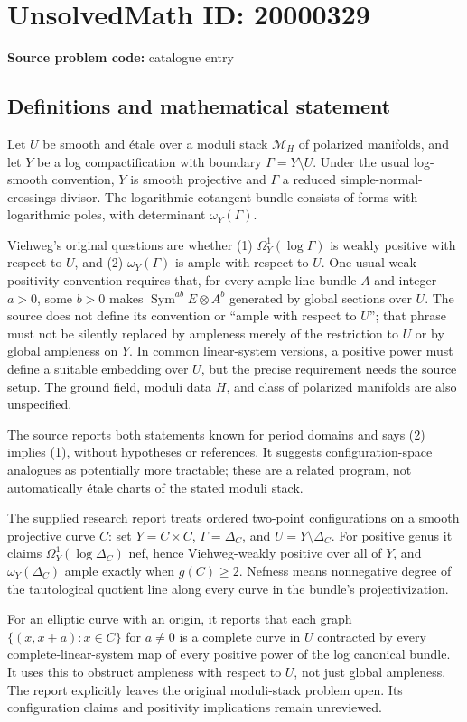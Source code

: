 \documentclass[11pt]{article}
\begin{document}
\section*{UnsolvedMath ID: 20000329}
\textbf{Source problem code:} catalogue entry
\subsection{Definitions and mathematical statement}
Let $U$ be smooth and \'etale over a moduli stack $\mathcal M_H$ of polarized manifolds, and let $Y$ be a log compactification with boundary $\Gamma=Y\setminus U$. Under the usual log-smooth convention, $Y$ is smooth projective and $\Gamma$ a reduced simple-normal-crossings divisor. The logarithmic cotangent bundle consists of forms with logarithmic poles, with determinant $\omega_Y(\Gamma)$.

Viehweg's original questions are whether (1) $\Omega_Y^1(\log\Gamma)$ is weakly positive with respect to $U$, and (2) $\omega_Y(\Gamma)$ is ample with respect to $U$. One usual weak-positivity convention requires that, for every ample line bundle $A$ and integer $a>0$, some $b>0$ makes $\operatorname{Sym}^{ab}E\otimes A^b$ generated by global sections over $U$. The source does not define its convention or ``ample with respect to $U$''; that phrase must not be silently replaced by ampleness merely of the restriction to $U$ or by global ampleness on $Y$. In common linear-system versions, a positive power must define a suitable embedding over $U$, but the precise requirement needs the source setup. The ground field, moduli data $H$, and class of polarized manifolds are also unspecified.

The source reports both statements known for period domains and says (2) implies (1), without hypotheses or references. It suggests configuration-space analogues as potentially more tractable; these are a related program, not automatically \'etale charts of the stated moduli stack.

The supplied research report treats ordered two-point configurations on a smooth projective curve $C$: set $Y=C\times C$, $\Gamma=\Delta_C$, and $U=Y\setminus\Delta_C$. For positive genus it claims $\Omega_Y^1(\log\Delta_C)$ nef, hence Viehweg-weakly positive over all of $Y$, and $\omega_Y(\Delta_C)$ ample exactly when $g(C)\geq2$. Nefness means nonnegative degree of the tautological quotient line along every curve in the bundle's projectivization.

For an elliptic curve with an origin, it reports that each graph $\{(x,x+a):x\in C\}$ for $a\ne0$ is a complete curve in $U$ contracted by every complete-linear-system map of every positive power of the log canonical bundle. It uses this to obstruct ampleness with respect to $U$, not just global ampleness. The report explicitly leaves the original moduli-stack problem open. Its configuration claims and positivity implications remain unreviewed.
\end{document}
